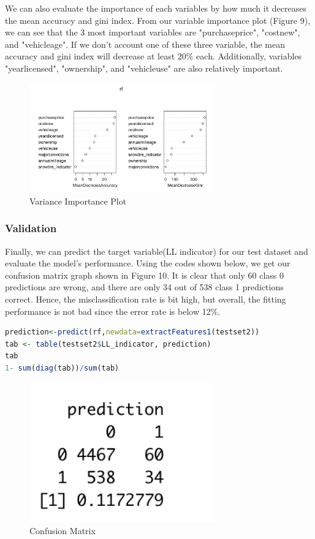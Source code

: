 \documentclass[12pt]{article} %
\theoremstyle{definition}
\begin{document}
We can also evaluate the importance of each variables by how much it decreases the mean accuracy and gini index. From our variable importance plot (Figure 9), we can see that the 3 most important variables are  "purchaseprice", "costnew", and "vehicleage". If we don't account one of these three variable, the mean accuracy and gini index will decrease at least 20\% each. Additionally, variables "yearlicensed", "ownership", and "vehicleuse" are also relatively important.

\begin{figure}[H]
    \centering
    \includegraphics[width=8cm]{RandomForest/varianceImportancePlot.png}
    \caption{Variance Importance Plot}
    \label{fig:subim2}
\end{figure}

\subsubsection{Validation}
Finally, we can predict the target variable(LL indicator) for our test dataset and evaluate the model's performance. Using the codes shown below, we get our confusion matrix graph\cite{confusionmatrix} shown in Figure 10. It is clear that only 60 class 0 predictions are wrong, and there are only 34 out of 538 class 1 predictions correct. Hence, the misclassification rate is bit high, but overall, the fitting performance is not bad since the error rate is below 12\%. 


\begin{lstlisting}[language=R,xleftmargin=.1\textwidth]
prediction<-predict(rf,newdata=extractFeatures1(testset2))
tab <- table(testset2$LL_indicator, prediction)
tab
1- sum(diag(tab))/sum(tab)
\end{lstlisting}

\begin{figure}[H]
    \centering
    \includegraphics[width=8cm]{RandomForest/prediction.png}
    \caption{Confusion Matrix}
    \label{fig:my_label}
\end{figure}
\end{document}
